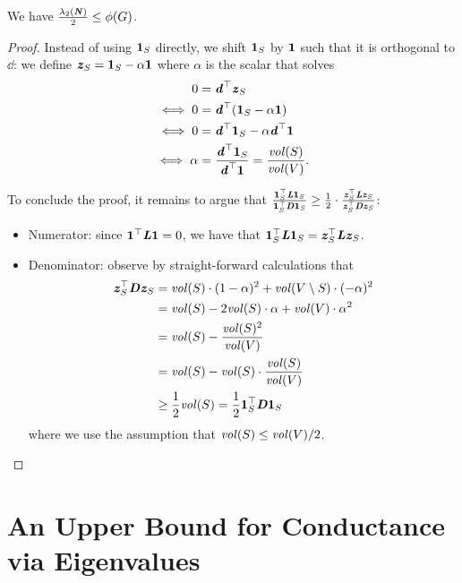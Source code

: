 \begin{theorem}\label{thm:cheegerInequLowerBound}
We have $\frac{\lambda_2(\NN)}{2} \leq \phi(G)$.
\end{theorem}
\begin{proof}
Instead of using $\vecone_S$ directly, we shift $\vecone_S$ by $\vecone$ such that it is orthogonal to $\dd$: we define $\zz_S = \vecone_S - \alpha \vecone$ where $\alpha$ is the scalar that solves
\begin{align*}
       0 &= \dd^\trp \zz_S \\
       \iff 0 &= \dd^\trp(\vecone_S - \alpha \vecone)\\
       \iff 0 &= \dd^\trp \vecone_S - \alpha  \dd^\trp\vecone \\
       \iff \alpha &= \frac{\dd^\trp \vecone_S}{\dd^\trp\vecone} = \frac{\vol(S)}{\vol(V)}.
\end{align*}

To conclude the proof, it remains to argue that $\frac{\vecone_S^\trp \LL \vecone_S}{\vecone_S^\trp\DD\vecone_S} \geq \frac{1}{2} \cdot \frac{\zz_S^\trp \LL \zz_S}{\zz_S^\trp\DD\zz_S}$:
\begin{itemize}
    \item Numerator: since $\vecone^\trp \LL \vecone = 0$, we have that $\vecone_S^\trp \LL \vecone_S = \zz_S^\trp \LL \zz_S$.
    \item Denominator: observe by straight-forward calculations that \begin{align*}
        \zz_S^\trp\DD\zz_S &= \vol(S) \cdot (1-\alpha)^2 + \vol(V \setminus S) \cdot (-\alpha)^2\\
        &= \vol(S) - 2\vol(S) \cdot \alpha + \vol(V) \cdot \alpha^2\\
        & = \vol(S) -   \frac{\vol(S)^2}{\vol(V)} \\
        & = \vol(S) - \vol(S) \cdot  \frac{\vol(S)}{\vol(V)}\\
        & \geq \frac{1}{2}\vol(S) = \frac{1}{2}\vecone_S^\trp\DD\vecone_S
    \end{align*}
    where we use the assumption that $\vol(S) \leq \vol(V)/2$.
\end{itemize}
\end{proof}

\section{An Upper Bound for Conductance via Eigenvalues}

